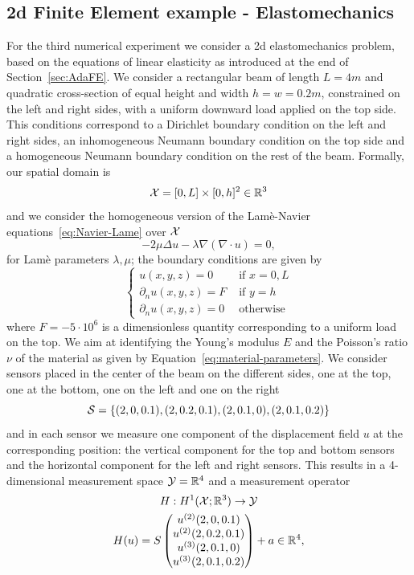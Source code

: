 \subsection{2d Finite Element example - Elastomechanics}\label{sec:FEexp}
For the third numerical experiment we consider a 2d elastomechanics problem, based on the equations of linear elasticity as introduced at the end of Section~\ref{sec:AdaFE}.
We consider a rectangular beam of length $L=4 m$ and quadratic cross-section of equal height and width $h=w=0.2 m$, constrained on the left and right sides, with a uniform downward load applied on the top side.
This conditions correspond to a Dirichlet boundary condition on the left and right sides, an inhomogeneous Neumann boundary condition on the top side and a homogeneous Neumann boundary condition on the rest of the beam.
Formally, our spatial domain is
\[
    \mathcal X = [0,L] \times [0,h] ^2 \in \mathbb{R}^3
\]
and we consider the homogeneous version of the Lamè-Navier equations~\eqref{eq:Navier-Lame} over $\mathcal X$
\[
    -2\mu \Delta u - \lambda \nabla (\nabla \cdot u) = 0,
\]
for Lamè parameters $\lambda, \mu$; the boundary conditions are given by
\[
    \begin{cases}
        u(x,y,z) = 0 & \text{ if } x = 0, L \\
        \partial_n u(x,y,z) = F & \text{ if } y = h \\
        \partial_n u(x,y,z) = 0 & \text{ otherwise}
    \end{cases}
\]
where $F = -5\cdot 10^6$ is a dimensionless quantity corresponding to a uniform load on the top.
We aim at identifying the Young's modulus $E$ and the Poisson's ratio $\nu$ of the material as given by Equation~\eqref{eq:material-parameters}.
We consider sensors placed in the center of the beam on the different sides, one at the top, one at the bottom, one on the left and one on the right
\[
    \mathcal S = \left\{ (2,0,0.1), (2,0.2,0.1), (2,0.1,0), (2,0.1,0.2) \right\} 
\]
and in each sensor we measure one component of the displacement field $u$ at the corresponding position: the vertical component for the top and bottom sensors and the horizontal component for the left and right sensors.
This results in a 4-dimensional measurement space $\mathcal Y = \mathbb{R}^4$ and a measurement operator \[
 \begin{gathered}
    H : H^1(\mathcal X;\mathbb{R}^3) \to \mathcal Y \\
    H(u) = S \begin{pmatrix}
     u^{(2)}(2,0,0.1)\\
     u^{(2)}(2,0.2,0.1)\\
     u^{(3)}(2,0.1,0)\\
     u^{(3)}(2,0.1,0.2) 
    \end{pmatrix} + a \in \mathbb{R}^4,
 \end{gathered}
\]
